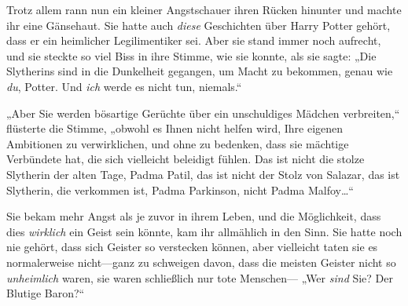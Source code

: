 Trotz allem rann nun ein kleiner Angstschauer ihren Rücken hinunter und machte ihr eine Gänsehaut. Sie hatte auch \emph{diese} Geschichten über Harry Potter gehört, dass er ein heimlicher Legilimentiker sei. Aber sie stand immer noch aufrecht, und sie steckte so viel Biss in ihre Stimme, wie sie konnte, als sie sagte: „Die Slytherins sind in die Dunkelheit gegangen, um Macht zu bekommen, genau wie \emph{du}, Potter. Und \emph{ich} werde es nicht tun, niemals.“

„Aber Sie werden bösartige Gerüchte über ein unschuldiges Mädchen verbreiten,“ flüsterte die Stimme, „obwohl es Ihnen nicht helfen wird, Ihre eigenen Ambitionen zu verwirklichen, und ohne zu bedenken, dass sie mächtige Verbündete hat, die sich vielleicht beleidigt fühlen. Das ist nicht die stolze Slytherin der alten Tage, Padma Patil, das ist nicht der Stolz von Salazar, das ist Slytherin, die verkommen ist, Padma Parkinson, nicht Padma Malfoy…“

Sie bekam mehr Angst als je zuvor in ihrem Leben, und die Möglichkeit, dass dies \emph{wirklich} ein Geist sein könnte, kam ihr allmählich in den Sinn. Sie hatte noch nie gehört, dass sich Geister so verstecken können, aber vielleicht taten sie es normalerweise nicht—ganz zu schweigen davon, dass die meisten Geister nicht so \emph{unheimlich} waren, sie waren schließlich nur tote Menschen— „Wer \emph{sind} Sie? Der Blutige Baron?“

